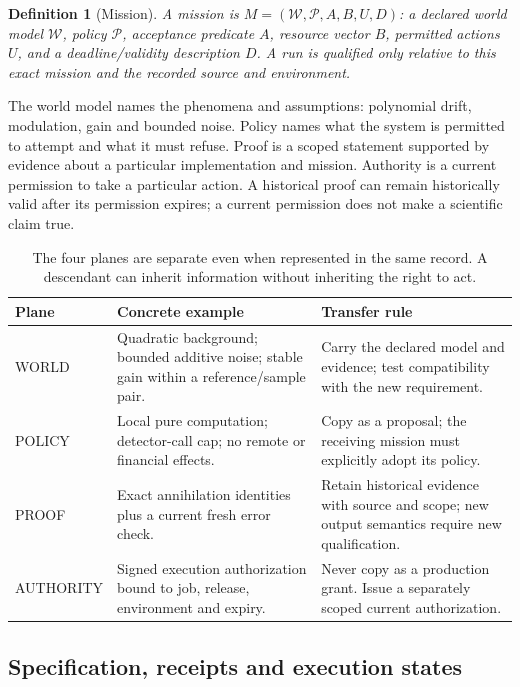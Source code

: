 \documentclass[11pt]{article}
\newtheorem{definition}{Definition}
\begin{document}
\begin{definition}[Mission]
A mission is $M=(\mathcal{W},\mathcal{P},A,B,U,D)$: a declared world model $\mathcal{W}$, policy $\mathcal{P}$, acceptance predicate $A$, resource vector $B$, permitted actions $U$, and a deadline/validity description $D$. A run is qualified only relative to this exact mission and the recorded source and environment.
\end{definition}

The world model names the phenomena and assumptions: polynomial drift, modulation, gain and bounded noise. Policy names what the system is permitted to attempt and what it must refuse. Proof is a scoped statement supported by evidence about a particular implementation and mission. Authority is a current permission to take a particular action. A historical proof can remain historically valid after its permission expires; a current permission does not make a scientific claim true.

\begin{table}[htbp]
\centering\small
\begin{tabularx}{\linewidth}{P{.17\linewidth}Y Y}
\toprule
\textbf{Plane} & \textbf{Concrete example} & \textbf{Transfer rule}\\
\midrule
WORLD & Quadratic background; bounded additive noise; stable gain within a reference/sample pair. & Carry the declared model and evidence; test compatibility with the new requirement.\\
POLICY & Local pure computation; detector-call cap; no remote or financial effects. & Copy as a proposal; the receiving mission must explicitly adopt its policy.\\
PROOF & Exact annihilation identities plus a current fresh error check. & Retain historical evidence with source and scope; new output semantics require new qualification.\\
AUTHORITY & Signed execution authorization bound to job, release, environment and expiry. & Never copy as a production grant. Issue a separately scoped current authorization.\\
\bottomrule
\end{tabularx}
\caption{The four planes are separate even when represented in the same record. A descendant can inherit information without inheriting the right to act.}
\label{tab:planes}
\end{table}

\subsection{Specification, receipts and execution states}
\end{document}
